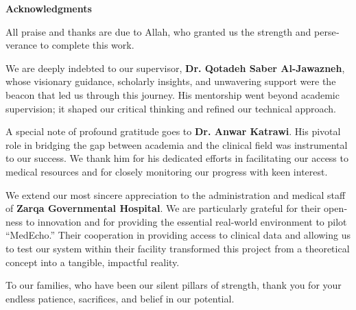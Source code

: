 \begin{english}
    
\newpage
\thispagestyle{empty}

\begin{center}
    {\Large\textbf{Acknowledgments}}
\end{center}

\vspace{1cm}

All praise and thanks are due to Allah, who granted us the strength and perseverance to complete this work.

\vspace{0.7cm}

We are deeply indebted to our supervisor, \textbf{Dr. Qotadeh Saber Al-Jawazneh}, whose visionary guidance, scholarly insights, and unwavering support were the beacon that led us through this journey. His mentorship went beyond academic supervision; it shaped our critical thinking and refined our technical approach.

\vspace{0.7cm}

A special note of profound gratitude goes to \textbf{Dr. Anwar Katrawi}. His pivotal role in bridging the gap between academia and the clinical field was instrumental to our success. We thank him for his dedicated efforts in facilitating our access to medical resources and for closely monitoring our progress with keen interest.

\vspace{0.7cm}

We extend our most sincere appreciation to the administration and medical staff of \textbf{Zarqa Governmental Hospital}. We are particularly grateful for their openness to innovation and for providing the essential real-world environment to pilot ``MedEcho.'' Their cooperation in providing access to clinical data and allowing us to test our system within their facility transformed this project from a theoretical concept into a tangible, impactful reality.

\vspace{0.7cm}

To our families, who have been our silent pillars of strength, thank you for your endless patience, sacrifices, and belief in our potential.

\end{english}